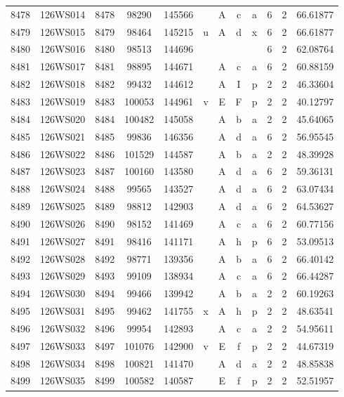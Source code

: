 \begin{tabular}{|*{12}{c|}}
8478 & 126WS014 & 8478 & 98290 & 145566 &  & A & c & a & 6 & 2 & 66.61877 \\ 
8479 & 126WS015 & 8479 & 98464 & 145215 & u & A & d & x & 6 & 2 & 66.61877 \\ 
8480 & 126WS016 & 8480 & 98513 & 144696 &  &  &  &  & 6 & 2 & 62.08764 \\ 
8481 & 126WS017 & 8481 & 98895 & 144671 &  & A & c & a & 6 & 2 & 60.88159 \\ 
8482 & 126WS018 & 8482 & 99432 & 144612 &  & A & I & p & 2 & 2 & 46.33604 \\ 
8483 & 126WS019 & 8483 & 100053 & 144961 & v & E & F & p & 2 & 2 & 40.12797 \\ 
8484 & 126WS020 & 8484 & 100482 & 145058 &  & A & b & a & 2 & 2 & 45.64065 \\ 
8485 & 126WS021 & 8485 & 99836 & 146356 &  & A & d & a & 6 & 2 & 56.95545 \\ 
8486 & 126WS022 & 8486 & 101529 & 144587 &  & A & b & a & 2 & 2 & 48.39928 \\ 
8487 & 126WS023 & 8487 & 100160 & 143580 &  & A & d & a & 6 & 2 & 59.36131 \\ 
8488 & 126WS024 & 8488 & 99565 & 143527 &  & A & d & a & 6 & 2 & 63.07434 \\ 
8489 & 126WS025 & 8489 & 98812 & 142903 &  & A & d & a & 6 & 2 & 64.53627 \\ 
8490 & 126WS026 & 8490 & 98152 & 141469 &  & A & c & a & 6 & 2 & 60.77156 \\ 
8491 & 126WS027 & 8491 & 98416 & 141171 &  & A & h & p & 6 & 2 & 53.09513 \\ 
8492 & 126WS028 & 8492 & 98771 & 139356 &  & A & b & a & 6 & 2 & 66.40142 \\ 
8493 & 126WS029 & 8493 & 99109 & 138934 &  & A & c & a & 6 & 2 & 66.44287 \\ 
8494 & 126WS030 & 8494 & 99466 & 139942 &  & A & b & a & 2 & 2 & 60.19263 \\ 
8495 & 126WS031 & 8495 & 99462 & 141755 & x & A & h & p & 2 & 2 & 48.63541 \\ 
8496 & 126WS032 & 8496 & 99954 & 142893 &  & A & c & a & 2 & 2 & 54.95611 \\ 
8497 & 126WS033 & 8497 & 101076 & 142900 & v & E & f & p & 2 & 2 & 44.67319 \\ 
8498 & 126WS034 & 8498 & 100821 & 141470 &  & A & d & a & 2 & 2 & 48.85838 \\ 
8499 & 126WS035 & 8499 & 100582 & 140587 &  & E & f & p & 2 & 2 & 52.51957 \\ 

\end{tabular}
